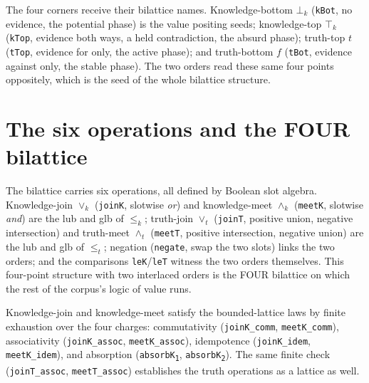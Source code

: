 \begin{definition}\label{def:four-charges}\leanok{}
  The four corners receive their bilattice names. Knowledge-bottom $\bot_k$ (\texttt{kBot}, no evidence, the potential phase) is the value positing seeds; knowledge-top $\top_k$ (\texttt{kTop}, evidence both ways, a held contradiction, the absurd phase); truth-top $t$ (\texttt{tTop}, evidence for only, the active phase); and truth-bottom $f$ (\texttt{tBot}, evidence against only, the stable phase). The two orders read these same four points oppositely, which is the seed of the whole bilattice structure.
\end{definition}

\section{The six operations and the FOUR bilattice}

\begin{definition}\label{def:four-bilattice}\leanok{}
  The bilattice carries six operations, all defined by Boolean slot algebra. Knowledge-join $\vee_k$ (\texttt{joinK}, slotwise \emph{or}) and knowledge-meet $\wedge_k$ (\texttt{meetK}, slotwise \emph{and}) are the lub and glb of $\le_k$; truth-join $\vee_t$ (\texttt{joinT}, positive union, negative intersection) and truth-meet $\wedge_t$ (\texttt{meetT}, positive intersection, negative union) are the lub and glb of $\le_t$; negation (\texttt{negate}, swap the two slots) links the two orders; and the comparisons \texttt{leK}/\texttt{leT} witness the two orders themselves. This four-point structure with two interlaced orders is the FOUR bilattice on which the rest of the corpus's logic of value runs.
\end{definition}

\begin{theorem}\label{thm:joinK-lattice}\leanok{}
  Knowledge-join and knowledge-meet satisfy the bounded-lattice laws by finite exhaustion over the four charges: commutativity (\texttt{joinK\_comm}, \texttt{meetK\_comm}), associativity (\texttt{joinK\_assoc}, \texttt{meetK\_assoc}), idempotence (\texttt{joinK\_idem}, \texttt{meetK\_idem}), and absorption (\texttt{absorbK\textsubscript{1}}, \texttt{absorbK\textsubscript{2}}). The same finite check (\texttt{joinT\_assoc}, \texttt{meetT\_assoc}) establishes the truth operations as a lattice as well.
\end{theorem}

